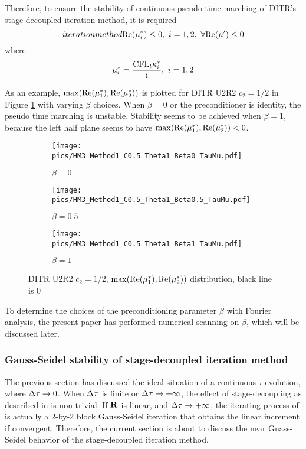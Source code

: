 \documentclass[preprint,12pt]{elsarticle}
\begin{document}
Therefore, to ensure the stability of continuous pseudo time
marching of DITR's stage-decoupled iteration method, it is
required
\begin{equation}iteration method
    \mathrm{Re}(\mu^*_i) \leq 0,\  i = 1,2,\  \forall \mathrm{Re}(\mu') \leq 0
\end{equation}
where
\begin{equation}
    \mu^*_i = \frac{\text{CFL}_t\kappa^*_i}{\mathrm{i}},\ i=1,2
\end{equation}

As an example, $\max(\mathrm{Re}(\mu^*_1),\mathrm{Re}(\mu^*_2))$ is plotted for
DITR U2R2 $c_2=1/2$ in Figure \ref{fig:MuU2R2} with varying $\beta$ choices.
When $\beta = 0$ or the preconditioner is identity, the pseudo time marching is
unstable. Stability seems to be achieved when $\beta = 1$, because
the left half plane seems to have $\max(\mathrm{Re}(\mu^*_1),\mathrm{Re}(\mu^*_2)) < 0$.
\begin{figure}[htbp]
    \centering
    \begin{subfigure}{0.33\textwidth}
        \texttt{[image: pics/HM3\_Method1\_C0.5\_Theta1\_Beta0\_TauMu.pdf]}
        \caption[]{$\beta = 0$}
    \end{subfigure}\hfill
    \begin{subfigure}{0.33\textwidth}
        \texttt{[image: pics/HM3\_Method1\_C0.5\_Theta1\_Beta0.5\_TauMu.pdf]}
        \caption[]{$\beta = 0.5$}
    \end{subfigure}\hfill
    \begin{subfigure}{0.33\textwidth}
        \texttt{[image: pics/HM3\_Method1\_C0.5\_Theta1\_Beta1\_TauMu.pdf]}
        \caption[]{$\beta = 1$}
    \end{subfigure}
    \caption{DITR U2R2 $c_2=1/2$, $\max(\mathrm{Re}(\mu^*_1),\mathrm{Re}(\mu^*_2))$ distribution, black line is 0}
    \label{fig:MuU2R2}
\end{figure}

To determine the choices of the preconditioning parameter  $\beta$
with Fourier analysis, the
present paper has performed numerical scanning
on $\beta$, which will be discussed later.

\subsubsection{Gauss-Seidel stability of stage-decoupled iteration method}
\label{sssec:GSStability}

The previous section has discussed the ideal
situation of a continuous $\tau$ evolution, where
$\mathrm\Delta \tau \rightarrow 0$. When $\mathrm\Delta \tau$ is finite
or $\mathrm\Delta \tau \rightarrow +\infty$,
the effect of stage-decoupling as described in 
is non-trivial.
If $\mathbf{R}$ is linear, and $\mathrm\Delta \tau \rightarrow +\infty$,
the iterating process of  is
actually a 2-by-2 block Gauss-Seidel iteration that obtains
the linear increment if convergent.
Therefore, the current section is about to discuss the
near Guass-Seidel behavior of the stage-decoupled iteration method.
\end{document}
